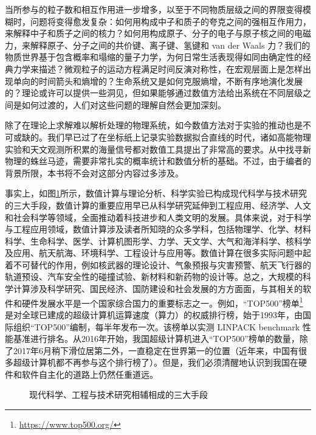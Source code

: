 当所参与的粒子数和相互作用进一步增多，以至于不同物质层级之间的界限变得模糊时，问题将变得愈发复杂：如何用构成中子和质子的夸克之间的强相互作用力，来解释中子和质子之间的核力？如何用构成原子、分子的电子与原子核之间的电磁力，来解释原子、分子之间的共价键、离子键、氢键和 van der Waals 力？我们的物质世界基于包含概率和塌缩的量子力学，为何日常生活表现得如同由确定性的经典力学来描述？微观粒子的运动方程满足时间反演对称性，在宏观层面上是怎样出现单向的时间箭头和熵增的？生命系统又是如何克服熵增，不断有序地演化发展的？理论或许可以提供一些洞见，但如果能够通过数值方法给出系统在不同层级之间是如何过渡的，人们对这些问题的理解自然会更加深刻。

除了在理论上求解难以解析处理的物理系统，如今数值方法对于实验的推动也是不可或缺的。我们早已过了在坐标纸上记录实验数据拟合直线的时代，诸如高能物理实验和天文观测所积累的海量信号都对数值工具提出了非常高的要求。从中找寻新物理的蛛丝马迹，需要非常扎实的概率统计和数值分析的基础。不过，由于编者的背景所限，本书将不会对这部分内容过多涉及。

事实上，如图\ref{fig:three-tools}所示，数值计算与理论分析、科学实验已构成现代科学与技术研究的三大手段，数值计算的重要应用早已从科学研究延伸到工程应用、经济学、人文和社会科学等领域，全面推动着科技进步和人类文明的发展。具体来说，对于科学与工程应用领域，数值计算涉及读者所知晓的众多学科，包括物理学、化学、材料科学、生命科学、医学、计算机图形学、力学、天文学、大气和海洋科学、核科学及应用、航天航海、环境科学、工程设计与应用等。数值计算在很多实际问题中起着不可替代的作用，例如核武器的理论设计、气象预报与灾害预警、航天飞行器的轨道预设、汽车安全性的碰撞试验、新材料和新药物的设计等。总之，大规模的科学计算涉及科学研究、国民经济、国防建设和社会发展的方方面面，与其相关的软件和硬件发展水平是一个国家综合国力的重要标志之一。例如，“TOP500”榜单\footnote{\url{https://www.top500.org/}}是对全球已建成的超级计算机运算速度（算力）的权威排行榜，始于1993年，由国际组织“TOP500”编制，每半年发布一次。该榜单以实测 LINPACK benchmark 性能基准进行排名。从2016年开始，我国超级计算机进入“TOP500”榜单的数量，除了2017年6月稍下滑位居第二外，一直稳定在世界第一的位置（近年来，中国有很多超级计算机都不再参与这个排行榜了）。但是，我们必须清醒地认识到我国在硬件和软件自主化的道路上仍然任重道远。

\begin{figure}[htbp]
\centering
{}
\caption{现代科学、工程与技术研究相辅相成的三大手段}
\label{fig:three-tools}
\end{figure}


